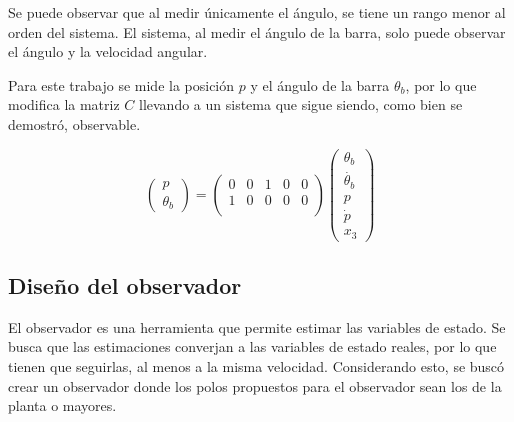 \documentclass[a4paper,10pt]{article}
\begin{document}
Se puede observar que al medir únicamente el ángulo, se tiene un rango menor al orden del sistema. El sistema, al medir el ángulo de la barra, solo puede observar el ángulo y la velocidad angular. 

Para este trabajo se mide la posición $p$ y el ángulo de la barra $\theta_b$, por lo que modifica la matriz $C$ llevando a un sistema que sigue siendo, como bien se demostró, observable.

\begin{equation*}
    \begin{pmatrix} p \\ \theta_b \end{pmatrix} = 
    \begin{pmatrix}
        0 & 0 & 1 & 0 & 0 \\
        1 & 0 & 0 & 0 & 0 \\
    \end{pmatrix} 
    \begin{pmatrix} 
        \theta_b \\ \dot{\theta_b} \\ p \\ \dot{p} \\ x_3
    \end{pmatrix}
\end{equation*}

\subsection{Diseño del observador}

El observador es una herramienta que permite estimar las variables de estado. Se busca que las estimaciones converjan a las variables de estado reales, por lo que tienen que seguirlas, al menos a la misma velocidad. Considerando esto, se buscó crear un observador donde los polos propuestos para el observador sean los de la planta o mayores. 
\end{document}
